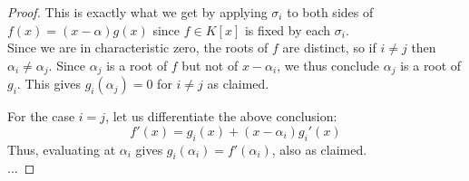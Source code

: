 \begin{proof}
	This is exactly what we get by applying $\sigma_i$ to both sides of $f(x) = (x-\alpha)g(x)$ since $f \in K[x]$ is fixed by each $\sigma_i$. \\
	
	Since we are in characteristic zero, the roots of $f$ are distinct, so if $i \neq j$ then $\alpha_i \neq \alpha_j$. Since $\alpha_j$ is a root of $f$ but not of $x-\alpha_i$, we thus conclude $\alpha_j$ is a root of $g_i$. This gives $g_i(\alpha_j) = 0$ for $i \neq j$ as claimed.
	
	For the case $i=j$, let us differentiate the above conclusion:
	\[ f'(x) = g_i(x) + (x-\alpha_i)g_i'(x) \]
	Thus, evaluating at $\alpha_i$ gives $g_i(\alpha_i) = f'(\alpha_i)$, also as claimed. \\
	
	...
\end{proof}
